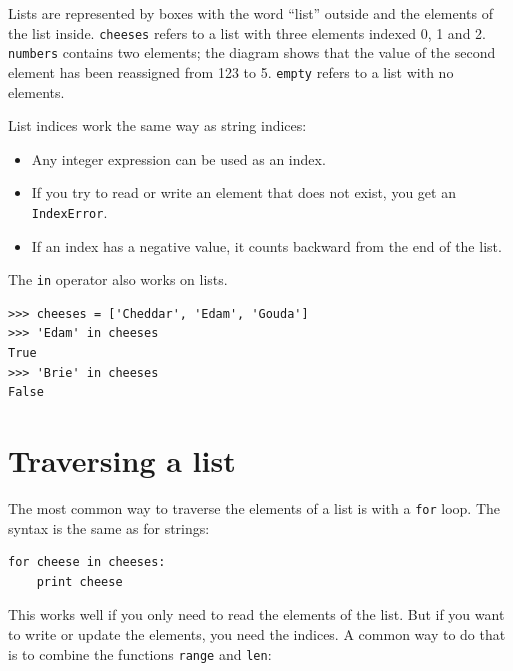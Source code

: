 \documentclass[10pt]{book}
\begin{document}
Lists are represented by boxes with the word ``list'' outside
and the elements of the list inside.  {\tt cheeses} refers to
a list with three elements indexed 0, 1 and 2.
{\tt numbers} contains two elements; the diagram shows that the
value of the second element has been reassigned from 123 to 5.
{\tt empty} refers to a list with no elements.

List indices work the same way as string indices:

\begin{itemize}

\item Any integer expression can be used as an index.

\item If you try to read or write an element that does not exist, you
get an {\tt IndexError}.

\item If an index has a negative value, it counts backward from the
end of the list.

\end{itemize}


The {\tt in} operator also works on lists.

\begin{verbatim}
>>> cheeses = ['Cheddar', 'Edam', 'Gouda']
>>> 'Edam' in cheeses
True
>>> 'Brie' in cheeses
False
\end{verbatim}


\section{Traversing a list}

The most common way to traverse the elements of a list is
with a {\tt for} loop.  The syntax is the same as for strings:

\begin{verbatim}
for cheese in cheeses:
    print cheese
\end{verbatim}
%
This works well if you only need to read the elements of the
list.  But if you want to write or update the elements, you
need the indices.  A common way to do that is to combine
the functions {\tt range} and {\tt len}:
\end{document}
